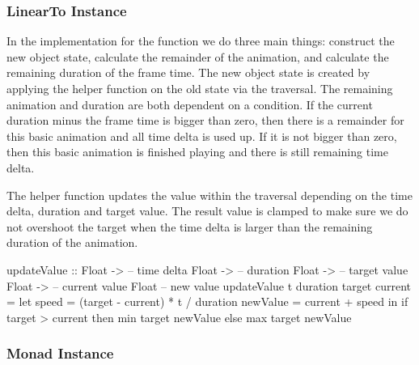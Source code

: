 \subsubsection{LinearTo Instance}

In the implementation for the  function we do three main things: construct the new object state, calculate the remainder of the animation, and calculate the remaining duration of the frame time. The new object state is created by applying the helper function  on the old state via the traversal. The remaining animation and duration are both dependent on a condition. If the current duration minus the frame time is bigger than zero, then there is a remainder for this basic animation and all time delta is used up. If it is not bigger than zero, then this basic animation is finished playing and there is still remaining time delta.


The  helper function updates the value within the traversal depending on the time delta, duration and target value. The result value is clamped to make sure we do not overshoot the target when the time delta is larger than the remaining duration of the animation.

\begin{code}
updateValue ::
  Float -> -- time delta
  Float -> -- duration
  Float -> -- target value
  Float -> -- current value
  Float -- new value
updateValue t duration target current = let
  speed = (target - current) * t / duration
  newValue = current + speed
  in if target > current
    then min target newValue
    else max target newValue
\end{code}

\subsubsection{Monad Instance}

